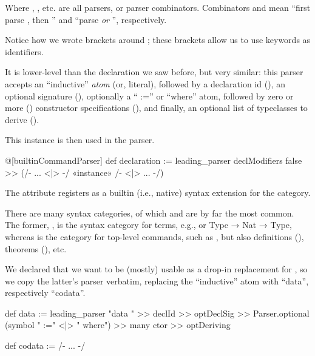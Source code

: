Where , , etc. are all parsers, or parser combinators. Combinators  and  mean ``first parse , then '' and ``parse  \emph{or} '', respectively.

\begin{remark}
    Notice how we wrote  brackets around \inductive{}; these brackets allow us to use 
    keywords as identifiers.
\end{remark}

It is lower-level than the  declaration we saw before, but very similar: this parser accepts an ``inductive'' \emph{atom} (or, literal), followed by a declaration id (), an optional signature (), optionally a `` :='' or ``where'' atom, followed by zero or more () constructor specifications (), and finally, an optional list of typeclasses to derive ().

This  instance is then used in the  parser.
\begin{leancode}
    @[builtinCommandParser] def declaration := leading_parser
            declModifiers false >> (/- ... <|> -/ «instance» /- <|> ... -/)
\end{leancode}

The  attribute registers  as a builtin (i.e., native) syntax extension for the  category.

\begin{remark}
    There are many syntax categories, of which  and  are by far the most common.
    The former, , is the syntax category for terms, e.g.,  or {Type → Nat → Type}, whereas  is the category for top-level commands, such as \inductive{}, but also definitions (), theorems (), etc.
\end{remark}


We declared that we want \data{} to be (mostly) usable as a drop-in replacement for \inductive{}, so we copy the latter's parser verbatim, replacing the ``inductive'' atom with ``data'', respectively ``codata''.
\begin{leancode}
    def data := leading_parser "data " >> declId  >> optDeclSig  
                        >> Parser.optional  (symbol " :=" <|> " where") 
                        >> many ctor 
                        >> optDeriving

    def codata := /- ... -/
\end{leancode}

